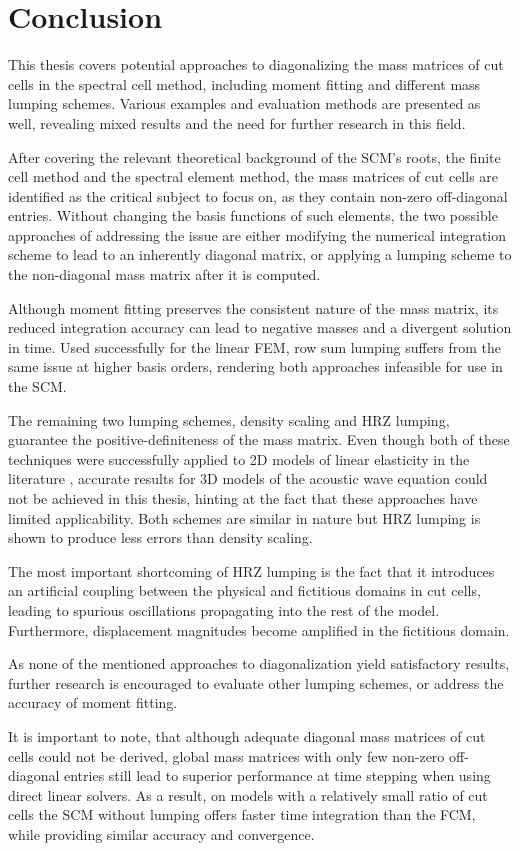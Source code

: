 %
\chapter{Conclusion}
\label{chapter:conclusion}
%

This thesis covers potential approaches to diagonalizing the mass matrices of cut cells in the spectral cell method, including moment fitting and different mass lumping schemes. Various examples and evaluation methods are presented as well, revealing mixed results and the need for further research in this field.

After covering the relevant theoretical background of the SCM's roots, the finite cell method and the spectral element method, the mass matrices of cut cells are identified as the critical subject to focus on, as they contain non-zero off-diagonal entries. Without changing the basis functions of such elements, the two possible approaches of addressing the issue are either modifying the numerical integration scheme to lead to an inherently diagonal matrix, or applying a lumping scheme to the non-diagonal mass matrix after it is computed.

Although moment fitting preserves the consistent nature of the mass matrix, its reduced integration accuracy can lead to negative masses and a divergent solution in time. Used successfully for the linear FEM, row sum lumping suffers from the same issue at higher basis orders, rendering both approaches infeasible for use in the SCM.

The remaining two lumping schemes, density scaling and HRZ lumping, guarantee the positive-definiteness of the mass matrix. Even though both of these techniques were successfully applied to 2D models of linear elasticity in the literature \cite{Joulaian2014}, accurate results for 3D models of the acoustic wave equation could not be achieved in this thesis, hinting at the fact that these approaches have limited applicability. Both schemes are similar in nature but HRZ lumping is shown to produce less errors than density scaling.

The most important shortcoming of HRZ lumping is the fact that it introduces an artificial coupling between the physical and fictitious domains in cut cells, leading to spurious oscillations propagating into the rest of the model. Furthermore, displacement magnitudes become amplified in the fictitious domain.

As none of the mentioned approaches to diagonalization yield satisfactory results, further research is encouraged to evaluate other lumping schemes, or address the accuracy of moment fitting.

It is important to note, that although adequate diagonal mass matrices of cut cells could not be derived, global mass matrices with only few non-zero off-diagonal entries still lead to superior performance at time stepping when using direct linear solvers. As a result, on models with a relatively small ratio of cut cells the SCM without lumping offers faster time integration than the FCM, while providing similar accuracy and convergence.
